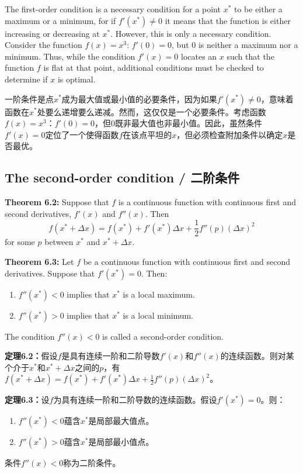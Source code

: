 \begin{original}
The first-order condition is a necessary condition for a point $x^*$ to be either a maximum or a minimum, for if $f'(x^*) \neq 0$ it means that the function is either increasing or decreasing at $x^*$. However, this is only a necessary condition. Consider the function $f(x) = x^3$: $f'(0) = 0$, but 0 is neither a maximum nor a minimum. Thus, while the condition $f'(x) = 0$ locates an $x$ such that the function $f$ is flat at that point, additional conditions must be checked to determine if $x$ is optimal.
\end{original}
\begin{translation}
一阶条件是点$x^*$成为最大值或最小值的必要条件，因为如果$f'(x^*) \neq 0$，意味着函数在$x^*$处要么递增要么递减。然而，这仅仅是一个必要条件。考虑函数$f(x) = x^3$：$f'(0) = 0$，但0既非最大值也非最小值。因此，虽然条件$f'(x) = 0$定位了一个使得函数$f$在该点平坦的$x$，但必须检查附加条件以确定$x$是否最优。
\end{translation}

\subsection{The second-order condition / 二阶条件}

\begin{original}
\textbf{Theorem 6.2:} Suppose that $f$ is a continuous function with continuous first and second derivatives, $f'(x)$ and $f''(x)$. Then
\[
f(x^* + \Delta x) = f(x^*) + f'(x^*)\Delta x + \frac{1}{2} f''(p)(\Delta x)^2 \tag{6.1}
\]
for some $p$ between $x^*$ and $x^* + \Delta x$.

\textbf{Theorem 6.3:} Let $f$ be a continuous function with continuous first and second derivatives. Suppose that $f'(x^*) = 0$. Then:
\begin{enumerate}
\item $f''(x^*) < 0$ implies that $x^*$ is a local maximum.
\item $f''(x^*) > 0$ implies that $x^*$ is a local minimum.
\end{enumerate}

The condition $f''(x) < 0$ is called a second-order condition.
\end{original}
\begin{translation}
\textbf{定理6.2：}假设$f$是具有连续一阶和二阶导数$f'(x)$和$f''(x)$的连续函数。则对某个介于$x^*$和$x^* + \Delta x$之间的$p$，有$f(x^* + \Delta x) = f(x^*) + f'(x^*)\Delta x + \frac{1}{2} f''(p)(\Delta x)^2$。

\textbf{定理6.3：}设$f$为具有连续一阶和二阶导数的连续函数。假设$f'(x^*) = 0$。则：
\begin{enumerate}
\item $f''(x^*) < 0$蕴含$x^*$是局部最大值点。
\item $f''(x^*) > 0$蕴含$x^*$是局部最小值点。
\end{enumerate}
条件$f''(x) < 0$称为二阶条件。
\end{translation}

